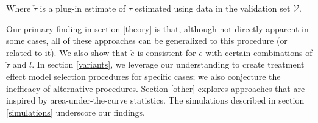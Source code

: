 Where $\check \tau$ is a plug-in estimate of $\tau$ estimated using data in the validation set $\mathcal{V}$. 

Our primary finding in section \ref{theory} is that, although not directly apparent in some cases, all of these approaches can be generalized to this procedure (or related to it). We also show that $\check e$ is consistent for $e$ with certain combinations of $\check\tau$ and $l$. In section \ref{variants}, we leverage our understanding to create treatment effect model selection procedures for specific cases;  we also conjecture the inefficacy of alternative procedures. Section \ref{other} explores approaches that are inspired by area-under-the-curve statistics. The simulations described in section \ref{simulations} underscore our findings.
